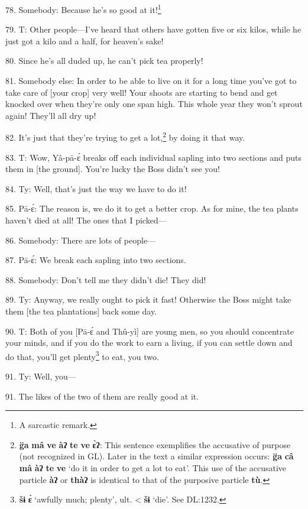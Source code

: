 78. Somebody: Because he's so good at it!\footnote{A sarcastic remark.}

79. T: Other people---I've heard that others have gotten five or six kilos, while
he just got a kilo and a half, for heaven's sake!

80. Since he's all duded up, he can't pick tea properly!

81. Somebody else: In order to be able to live on it for a long time you've got
to take care of [your crop] very well! Your shoots are starting to bend and get
knocked over when they're only one span high. This whole year they won't sprout
again! They'll all dry up!

82. It's just that they're trying to get a lot,\footnote{\textbf{g̈a} \textbf{mâ} \textbf{ve} \textbf{àʔ} \textbf{te} \textbf{ve} \textbf{ɛ̀ʔ}: This sentence exemplifies the accusative of purpose (not recognized in GL). Later in the text a similar expression occurs: \textbf{g̈a} \textbf{câ} \textbf{mâ} \textbf{àʔ} \textbf{te} \textbf{ve} `do it in order to get a lot to eat'. This use of the accusative particle \textbf{àʔ} or \textbf{thàʔ} is identical to that of the purposive particle \textbf{tù}.} by doing it that way.

83. T: Wow, Yâ-pā-ɛ́\textit{ }breaks off each individual sapling into two
sections and puts them in [the ground]. You're lucky the Boss didn't see you!

84. Ty: Well, that's just the way we have to do it!

85. Pā-ɛ́: The reason is, we do it to get a better crop. As for mine, the tea
plants haven't died at all! The ones that I picked---

86. Somebody: There are lots of people---

87. Pā-ɛ́: We break each sapling into two sections.

88. Somebody: Don't tell me they didn't die! They did!

89. Ty: Anyway, we really ought to pick it fast! Otherwise the Boss might take
them [the tea plantations] back some day.

90. T: Both of you [Pā-ɛ́ and Thû-yì] are young men, so you should concentrate
your minds, and if you do the work to earn a living, if you can settle down and
do that, you'll get plenty\footnote{\textbf{šɨ} \textbf{ɛ̀} `awfully much; plenty', ult. < \textbf{šɨ} `die'. See DL:1232.} to eat, you two.

91. Ty: Well, you---

91. The likes of the two of them are really good at it.

